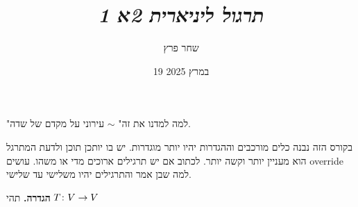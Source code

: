 \documentclass[]{../../../../tex/classes/styledArticle}
\author{שחר פרץ}
\title{\textit{תרגול ליניארית 2א 1}}
\date{19 במרץ 2025}
\begin{document}
	\maketitle
	"למה למדנו את זה" $\sim$ עירוני על מקדם של שדה. 
	
	בקורס הזה נבנה כלים מורכבים וההגדרות יהיו יותר מוגדרות. יש בו יותכן תוכן ולדעת המתרגל הוא מעניין יותר וקשה יותר. לכתוב אם יש תרגילים ארוכים מדי או משהו. עושים override למה שבן אמר והתרגילים יהיו משלישי עד שלישי. 
	
	\textbf{הגדרה. }תהי $T \colon V \to V$
\end{document}
